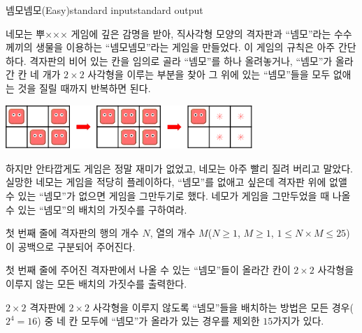 \begin{problem}{넴모넴모(Easy)}{standard input}{standard output}

네모는 뿌××× 게임에 깊은 감명을 받아, 직사각형 모양의 격자판과 ``넴모''라는 수수께끼의 생물을 이용하는 ``넴모넴모''라는 게임을 만들었다. 이 게임의 규칙은 아주 간단하다. 격자판의 비어 있는 칸을 임의로 골라 ``넴모''를 하나 올려놓거나, ``넴모''가 올라간 칸 네 개가 $2 \times 2$ 사각형을 이루는 부분을 찾아 그 위에 있는 ``넴모''들을 모두 없애는 것을 질릴 때까지 반복하면 된다.

\begin{center}
  \includegraphics[width=0.7\textwidth]{nemo.png}
\end{center}

하지만 안타깝게도 게임은 정말 재미가 없었고, 네모는 아주 빨리 질려 버리고 말았다. 실망한 네모는 게임을 적당히 플레이하다, ``넴모''를 없애고 싶은데 격자판 위에 없앨 수 있는 ``넴모''가 없으면 게임을 그만두기로 했다. 네모가 게임을 그만두었을 때 나올 수 있는 ``넴모''의 배치의 가짓수를 구하여라.

\InputFile
첫 번째 줄에 격자판의 행의 개수 $N$, 열의 개수 $M$($N \ge 1$, $M \ge 1$, $1 \le N \times M \le 25$)이 공백으로 구분되어 주어진다.

\OutputFile
첫 번째 줄에 주어진 격자판에서 나올 수 있는 ``넴모''들이 올라간 칸이 $2 \times 2$ 사각형을 이루지 않는 모든 배치의 가짓수를 출력한다.

\Example

\begin{example}
%
%
%
\end{example}

\Notes
$2 \times 2$ 격자판에 $2 \times 2$ 사각형을 이루지 않도록 ``넴모''들을 배치하는 방법은 모든 경우($2^{4}=16$) 중 네 칸 모두에 ``넴모''가 올라가 있는 경우를 제외한 $15$가지가 있다.

\end{problem}
